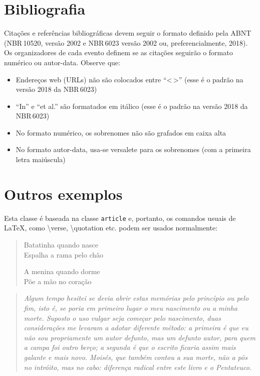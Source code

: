 \documentclass[english,notblind]{sbc20}
\begin{document}
\section{Bibliografia}

Citações e referências bibliográficas devem seguir o formato definido pela ABNT (NBR\,10520, versão 2002 e NBR\,6023 versão 2002 ou, preferencialmente, 2018). Os organizadores de cada evento definem se as citações seguirão o formato numérico ou autor-data. Observe que:

\begin{itemize}
  \item Endereços web (URLs) não são colocados entre ``<\,>'' (esse é o padrão na versão 2018 da NBR\,6023)
  \item ``In'' e ``et al.'' são formatados em itálico (esse é o padrão na versão 2018 da NBR\,6023)
  \item No formato numérico, os sobrenomes não são grafados em caixa alta
  \item No formato autor-data, usa-se versalete para os sobrenomes (com a primeira letra maiúscula)
\end{itemize}

\section{Outros exemplos}

Esta classe é baseada na classe \texttt{article} e, portanto, os comandos usuais de \LaTeX, como \textsf{\textbackslash{}verse}, \textsf{\textbackslash{}quotation} etc. podem ser usados normalmente:

\begin{verse}
Batatinha quando nasce\\
Espalha a rama pelo chão

A menina quando dorme\\
Põe a mão no coração
\end{verse}

\begin{quotation}
\itshape
Algum tempo hesitei se devia abrir estas memórias pelo princípio ou
pelo fim, isto é, se poria em primeiro lugar o meu nascimento ou a
minha morte. Suposto o uso vulgar seja começar pelo nascimento,
duas considerações me levaram a adotar diferente método: a
primeira é que eu não sou propriamente um autor defunto, mas um
defunto autor, para quem a campa foi outro berço; a segunda é que
o escrito ficaria assim mais galante e mais novo. Moisés, que também
contou a sua morte, não a pôs no intróito, mas no cabo: diferença
radical entre este livro e o Pentateuco.
\end{quotation}
\end{document}
